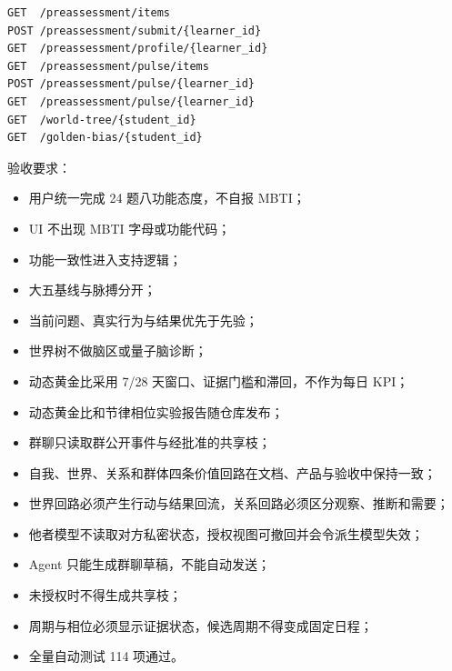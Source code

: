 \documentclass[UTF8,a4paper,11pt]{ctexart}
\begin{document}
\begin{verbatim}
GET  /preassessment/items
POST /preassessment/submit/{learner_id}
GET  /preassessment/profile/{learner_id}
GET  /preassessment/pulse/items
POST /preassessment/pulse/{learner_id}
GET  /preassessment/pulse/{learner_id}
GET  /world-tree/{student_id}
GET  /golden-bias/{student_id}
\end{verbatim}

验收要求：

\begin{itemize}
\item 用户统一完成 24 题八功能态度，不自报 MBTI；
\item UI 不出现 MBTI 字母或功能代码；
\item 功能一致性进入支持逻辑；
\item 大五基线与脉搏分开；
\item 当前问题、真实行为与结果优先于先验；
\item 世界树不做脑区或量子脑诊断；
\item 动态黄金比采用 7/28 天窗口、证据门槛和滞回，不作为每日 KPI；
\item 动态黄金比和节律相位实验报告随仓库发布；
\item 群聊只读取群公开事件与经批准的共享枝；
\item 自我、世界、关系和群体四条价值回路在文档、产品与验收中保持一致；
\item 世界回路必须产生行动与结果回流，关系回路必须区分观察、推断和需要；
\item 他者模型不读取对方私密状态，授权视图可撤回并会令派生模型失效；
\item Agent 只能生成群聊草稿，不能自动发送；
\item 未授权时不得生成共享枝；
\item 周期与相位必须显示证据状态，候选周期不得变成固定日程；
\item 全量自动测试 114 项通过。
\end{itemize}
\end{document}
